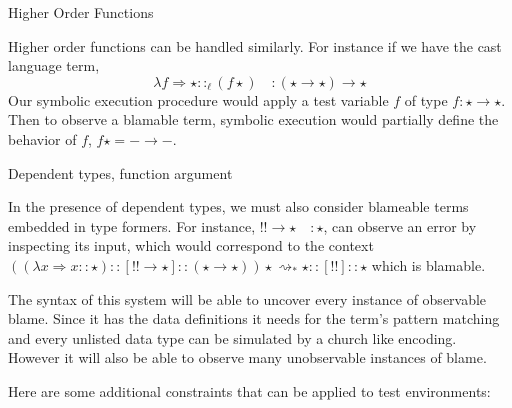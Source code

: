 \begin{example}
Higher Order Functions

Higher order functions can be handled similarly.
For instance if we have the cast language term,
\[
\lambda f\Rightarrow\star::_{\ell }(f\star) \quad : \left(\star\rightarrow\star\right)\rightarrow\star
\]
  Our symbolic execution procedure would apply a test variable $f$ of type $f:\star\rightarrow\star$.
Then to observe a blamable term, symbolic execution would partially define the behavior of $f$, $f\star=-\rightarrow-$.
\end{example}

  
 \begin{example}
 Dependent types, function argument
  
 In the presence of dependent types, we must also consider blameable terms embedded in type formers.
 For instance, $!!\rightarrow\star\quad:\star$, can observe an error by inspecting its input, which would correspond to the context $\left(\left(\lambda x\Rightarrow x::\star\right)::[!!\rightarrow\star]::\left(\star\rightarrow\star\right)\right)\star\rightsquigarrow_{*}\star::[!!]::\star$ which is blamable.
 \end{example}
  
 The syntax of this system will be able to uncover every instance of observable blame.
 Since it has the data definitions it needs for the term's pattern matching and every unlisted data type can be simulated by a church like encoding.
 However it will also be able to observe many unobservable instances of blame.
  
 Here are some additional constraints that can be applied to test environments:
  
  
 



